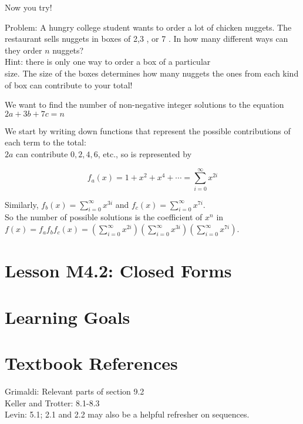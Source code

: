 \documentclass{article}
\begin{document}
Now you try!

Problem: A hungry college student wants to order a lot of chicken nuggets. The restaurant sells nuggets in boxes of 2,3 , or 7 . In how many different ways can they order $n$ nuggets?\\
Hint: there is only one way to order a box of a particular\\
size. The size of the boxes determines how many nuggets the ones from each kind of box can contribute to your total!

We want to find the number of non-negative integer solutions to the equation $2 a+3 b+7 c=n$

We start by writing down functions that represent the possible contributions of each term to the total:\\
$2 a$ can contribute $0,2,4,6$, etc., so is represented by

$$
f_{a}(x)=1+x^{2}+x^{4}+\cdots=\sum_{i=0}^{\infty} x^{2 i}
$$

Similarly, $f_{b}(x)=\sum_{i=0}^{\infty} x^{3 i}$ and $f_{c}(x)=\sum_{i=0}^{\infty} x^{7 i}$.\\
So the number of possible solutions is the coefficient of $x^{n}$ in\\
$f(x)=f_{a} f_{b} f_{c}(x)=\left(\sum_{i=0}^{\infty} x^{2 i}\right)\left(\sum_{i=0}^{\infty} x^{3 i}\right)\left(\sum_{i=0}^{\infty} x^{7 i}\right)$.











\newpage



\section*{Lesson M4.2: Closed Forms}
\section*{Learning Goals}
\section*{Textbook References}
Grimaldi: Relevant parts of section 9.2\\
Keller and Trotter: 8.1-8.3\\
Levin: 5.1; 2.1 and 2.2 may also be a helpful refresher on sequences.
\end{document}
